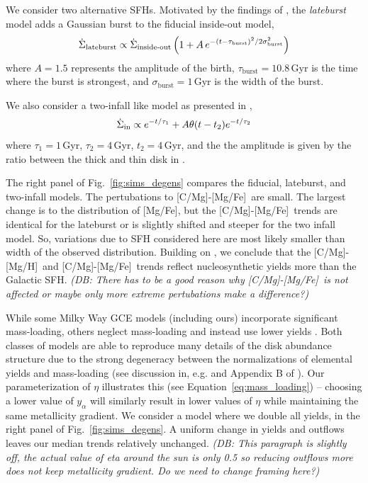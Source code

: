 \documentclass[fleqn,
referee, %
usenatbib]{mnras}
\newcommand{\JJ}{\citetalias{james+21}}
\newcommand{\gce}{GCE}
\newcommand{\caah}{[C/Mg]-[Mg/H]}
\newcommand{\caafe}{[C/Mg]-[Mg/Fe]}
\newcommand{\dbnote}[1]{ {\color{Thistle} \textit{\small (DB: #1)}} }
\begin{document}
We consider two alternative SFHs. 
Motivated by the findings of \citet[see discussion in \JJ]{mor+19,isern19}, the \textit{lateburst} model
adds a Gaussian burst to the fiducial inside-out model, 
\begin{equation}\label{eq:lateburst}
    \dot{\Sigma}_\text{lateburst} \propto \dot{\Sigma}_\text{inside-out} \left(1 + A\,e^{-(t-\tau_{\rm burst})^2/2\sigma^2_{\rm burst}} \right)
\end{equation}
where $A=1.5$ represents the amplitude of the birth, $\tau_\text{burst}=10.8$\,Gyr is the time where the burst is strongest, and $\sigma_\text{burst}=1$\,Gyr is the width of the burst.

We also consider a two-infall like model as presented in \citep{dubay+24},
\begin{equation}\label{twoinfall}
\dot{\Sigma}_{\rm in} \propto e^{-t/\tau_1} + A \theta(t - t_{2}) e^{-t/\tau_2}
\end{equation}
where $\tau_1=1\,$Gyr, $\tau_2=4\,$Gyr, $t_2=4$\,Gyr, and the the amplitude is given by the ratio between the thick and thin disk in  \citet{BHG16}.

The right panel of Fig.~\ref{fig:sims_degens} compares the fiducial, lateburst, and two-infall models. The pertubations to \caafe\ are small. The largest change is to the distribution of [Mg/Fe], but the \caafe\ trends are identical for the lateburst or is slightly shifted and steeper for the two infall model. So, variations due to SFH considered here are most likely smaller than width of the observed distribution.
Building on \citet{james+23}, we conclude that the \caah\ and \caafe\ trends reflect nucleosynthetic yields more than the Galactic SFH. 
\dbnote{There has to be a good reason why \caafe\ is not affected or maybe only more extreme pertubations make a difference?}



While some Milky Way \gce{} models (including ours) incorporate significant mass-loading, others
neglect mass-loading and instead use lower yields \citep[e.g.][]{MCM13, MCM14, spitoni19, spitoni20, spitoni21}.
Both classes of models are able to reproduce many details of the disk abundance structure due to the strong degeneracy between the normalizations of elemental yields and mass-loading (see discussion in, e.g. \citealt{sandford+24} and Appendix B of \citealt{james+23}). 
Our parameterization of $\eta$ illustrates this (see Equation~\ref{eq:mass_loading}) -- choosing a lower value of $y_{\alpha}$ will similarly result in lower values of $\eta$ while maintaining the same metallicity gradient. 
We consider a model where we double all yields, in the right panel of Fig.~\ref{fig:sims_degens}. A uniform change in yields and outflows leaves our median trends relatively unchanged. 
\dbnote{This paragraph is slightly off, the actual value of eta around the sun is only 0.5 so reducing outflows more does not keep metallicity gradient. Do we need to change framing here?}
\end{document}
